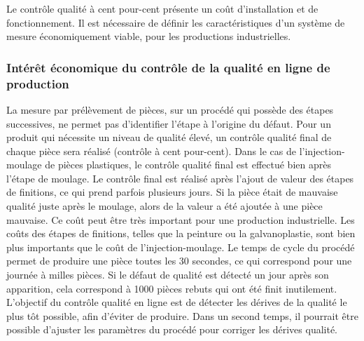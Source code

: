 Le contrôle qualité à cent pour-cent présente un coût d'installation et de fonctionnement.
Il est nécessaire de définir les caractéristiques d'un système de mesure économiquement viable, pour les productions industrielles.

\subsubsection{Intérêt économique du contrôle de la qualité en ligne de production}
La mesure par prélèvement de pièces, sur un procédé qui possède des étapes successives, ne permet pas d’identifier l’étape à l’origine du défaut.
Pour un produit qui nécessite un niveau de qualité élevé, un contrôle qualité final de chaque pièce sera réalisé (contrôle à cent pour-cent).
Dans le cas de l'injection-moulage de pièces plastiques, le contrôle qualité final est effectué bien après l’étape de moulage.
Le contrôle final est réalisé après l’ajout de valeur des étapes de finitions, ce qui prend parfois plusieurs jours.
Si la pièce était de mauvaise qualité juste après le moulage, alors de la valeur a été ajoutée à une pièce mauvaise.
Ce coût peut être très important pour une production industrielle.
Les coûts des étapes de finitions, telles que la peinture ou la galvanoplastie, sont bien plus importants que le coût de l'injection-moulage.
Le temps de cycle du procédé permet de produire une pièce toutes les 30 secondes, ce qui correspond pour une journée à milles pièces.
Si le défaut de qualité est détecté un jour après son apparition, cela correspond à 1000 pièces rebuts qui ont été finit inutilement.
L’objectif du contrôle qualité en ligne est de détecter les dérives de la qualité le plus tôt possible, afin d'éviter de produire.
Dans un second temps, il pourrait être possible d'ajuster les paramètres du procédé pour corriger les dérives qualité.

